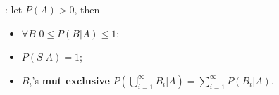 : let \(P(A) > 0\), then
\begin{multicols}{2}
\begin{itemize}
  \item \(\forall B\) \tf \(0 \leq P(B|A) \leq 1\);
  \item \(P(S|A) = 1\);
\end{itemize}
\end{multicols}
\begin{itemize}
  \item \(B_i\)'s \textbf{mut exclusive} \tf \(P(\bigcup\limits_{i=1}^{\infty}B_i|A)
    = \sum\limits_{i=1}^{\infty}P(B_i|A)\).
\end{itemize}

